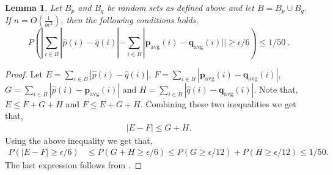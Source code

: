 \documentclass[10pt]{article} %
\theoremstyle{plain}
\newtheorem{lemma}[theorem]{Lemma}
\newcommand{\bp}{\textbf{p}}
\newcommand{\bq}{\textbf{q}}
\newcommand{\avg}{\mathrm{avg}}
\begin{document}
\begin{lemma}\label{lem:heavy}
	Let $B_p$ and $B_{q}$ be random sets as defined above and let $B = B_{p}\cup B_{q}$. If $n=O(\frac{1}{b\epsilon^2})$, then the following conditions holds,
	$$P(|\sum_{i \in B}|\hat{p}(i)-\hat{q}(i)| -\sum_{i \in B} |\bp_{\avg}(i)-\bq_{\avg}(i)|| \geq \epsilon/6) \leq 1/50~.$$
\end{lemma}
\begin{proof}
	Let $E=\sum_{i \in B}|\hat{p}(i)-\hat{q}(i)|$, $F=\sum_{i \in B} |\bp_{\avg}(i)-\bq_{\avg}(i)|$, $G=\sum_{i \in B}|\hat{p}(i)-\bp_{\avg}(i)|$ and $H=\sum_{i \in B}|\hat{q}(i)-\bq_{\avg}(i)|$. Note that, $E  \leq F+G+H$ and $F  \leq E+G+H$.
	Combining these two inequalities we get that,
	\begin{align}
		|E-F| \leq G+H.
	\end{align}
	Using the above inequality we get that,
	\begin{align}
		P(|E-F| \geq \epsilon/6) & \leq P(G+H \geq \epsilon/6) \leq P(G \geq \epsilon/12)+P(H \geq \epsilon/12) \leq 1/50.
	\end{align}
	The last expression follows from .
\end{proof}
\end{document}
